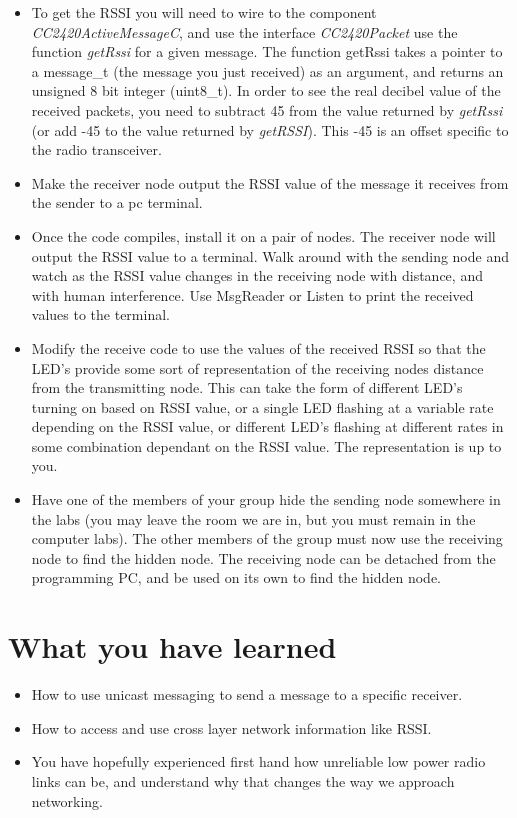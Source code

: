 \documentclass [a4] {article}
\begin{document}
\begin{itemize}

\item To get the RSSI you will need to wire to the component \emph{CC2420ActiveMessageC}, and use the interface \emph{CC2420Packet} use the function \emph{getRssi} for a given message. The function getRssi takes a pointer to a message\_t (the message you just received) as an argument, and returns an unsigned 8 bit integer (uint8\_t). In order to see the real decibel value of the received packets, you need to subtract 45 from the value returned by \emph{getRssi} (or add -45 to the value returned by \emph{getRSSI}). This -45 is an offset specific to the radio transceiver.
 
\item Make the receiver node output the RSSI value of the message it receives from the sender to a pc terminal.

\item Once the code compiles, install it on a pair of nodes. The receiver node will output the RSSI value to a terminal. Walk around with the sending node and watch as the RSSI value changes in the receiving node with distance, and with human interference. Use MsgReader or Listen to print the received values to the terminal.

\item Modify the receive code to use the values of the received RSSI so that the LED's provide some sort of representation of the receiving nodes distance from the transmitting node. This can take the form of different LED's turning on based on RSSI value, or a single LED flashing at a variable rate depending on the RSSI value, or different LED's flashing at different rates in some combination dependant on the RSSI value. The representation is up to you.

\item Have one of the members of your group hide the sending node somewhere in the labs (you may leave the room we are in, but you must remain in the computer labs). The other members of the group must now use the receiving node to find the hidden node. The receiving node can be detached from the programming PC, and be used on its own to find the hidden node.

\end{itemize}

\section{What you have learned}

\begin{itemize}

\item How to use unicast messaging to send a message to a specific receiver.
\item How to access and use cross layer network information like RSSI.
\item You have hopefully experienced first hand how unreliable low power radio links can be, and understand why that changes the way we approach networking.

\end{itemize}
\end{document}
